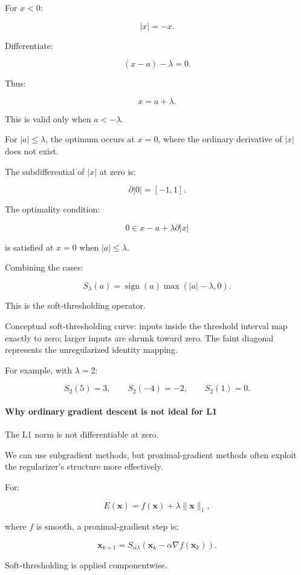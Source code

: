 For \(x<0\):

\[
|x|=-x.
\]

Differentiate:

\[
(x-a)-\lambda=0.
\]

Thus:

\[
x=a+\lambda.
\]

This is valid only when \(a<-\lambda\).

For \(|a|\le\lambda\), the optimum occurs at \(x=0\), where the ordinary derivative of \(|x|\) does not exist.

The subdifferential of \(|x|\) at zero is:

\[
\partial|0|=[-1,1].
\]

The optimality condition:

\[
0\in x-a+\lambda\partial|x|
\]

is satisfied at \(x=0\) when \(|a|\le\lambda\).

Combining the cases:

\[
\boxed{ S_\lambda(a)= \operatorname{sign}(a) \max(|a|-\lambda,0) }.
\]

This is the soft-thresholding operator.

Conceptual soft-thresholding curve: inputs inside the threshold interval map exactly to zero; larger inputs are shrunk toward zero. The faint diagonal represents the unregularized identity mapping.

For example, with \(\lambda=2\):

\[
S_2(5)=3,\qquad S_2(-4)=-2,\qquad S_2(1)=0.
\]

\paragraph{Why ordinary gradient descent is not ideal for L1}\label{02-foundations-ii-ch027-why-ordinary-gradient-descent-is-not-ideal-for-l1}

The L1 norm is not differentiable at zero.

We can use subgradient methods, but proximal-gradient methods often exploit the regularizer's structure more effectively.

For:

\[
E(\mathbf x)=f(\mathbf x)+\lambda\|\mathbf x\|_1,
\]

where \(f\) is smooth, a proximal-gradient step is:

\[
\boxed{ \mathbf x_{k+1} = S_{\alpha\lambda} \left( \mathbf x_k-\alpha\nabla f(\mathbf x_k) \right) }.
\]

Soft-thresholding is applied componentwise.

